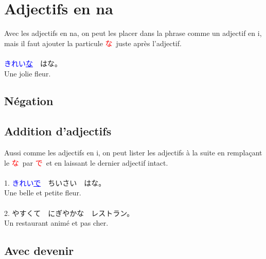 \documentclass[11pt]{report}
\newenvironment{Japanese}{%
\CJKfamily{min}%
\CJKtilde  
\CJKnospace}{}
\begin{document}
\section{Adjectifs en na}

\begin{CJK}{UTF8}{}  
\begin{Japanese}
	Avec les adjectifs en na, on peut les placer dans la phrase comme un adjectif en i, mais il faut ajouter la particule \textcolor{red}{な} \,juste après l'adjectif. \\ \\
	\textcolor{blue}{きれい\underline{な}}　はな。\\
	Une jolie fleur.
\end{Japanese}  
\end{CJK}

\subsection{Négation}

\begin{CJK}{UTF8}{}  
\begin{Japanese}
	
\end{Japanese}  
\end{CJK}

\subsection{Addition d'adjectifs}

\begin{CJK}{UTF8}{}  
\begin{Japanese}
	Aussi comme les adjectifs en i, on peut lister les adjectifs \`a la suite en remplaçant le \textcolor{red}{な} \,par \textcolor{red}{で} \,et en laissant le dernier adjectif intact. \\ \\
	1. \textcolor{blue}{きれい\underline{で}}　ちいさい　はな。 \\
	Une belle et petite fleur. \\ \\
	2. やすくて　にぎやかな　レストラン。 \\
	Un restaurant anim\'e et pas cher.
\end{Japanese}  
\end{CJK}

\subsection{Avec devenir}
\end{document}
